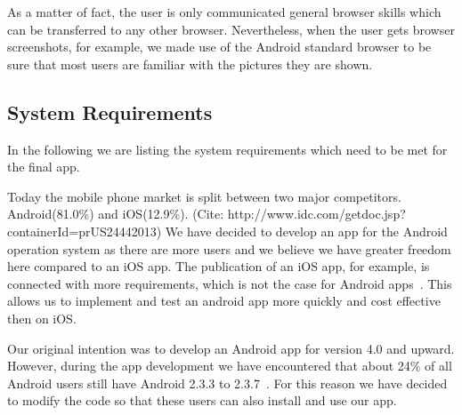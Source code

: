 \begin{description}[leftmargin=0cm]

	\item[Considered Browser] As a matter of fact, the user is only communicated general browser skills which can be transferred to any other browser.
Nevertheless, when the user gets browser screenshots, for example, we made use of the Android standard browser to be sure that most users are familiar with the pictures they are shown.
\end{description}	

\subsection{System Requirements}
In the following we are listing the system requirements which need to be met for the final app.


\begin{description}[leftmargin=0cm]
	\item[Android] Today the mobile phone market is split between two major competitors. Android(81.0\%) and iOS(12.9\%). (Cite: http://www.idc.com/getdoc.jsp?containerId=prUS24442013)
	We have decided to develop an app for the Android operation system as there are more users and we believe we have greater freedom here compared to an iOS app. 
 The publication of an iOS app, for example, is connected with more requirements, which is not the case for Android apps~\cite{publishios, publishandroid}. This allows us to implement and test an android app more quickly and cost effective then on iOS. 
	\item[Version] Our original intention was to develop an Android app for version 4.0 and upward.
 However, during the app development we have encountered that about 24\% of all Android users still have Android 2.3.3 to 2.3.7~\cite{}. For this reason we have decided to modify the code so that these users can also install and use our app.
 
\end{description}

